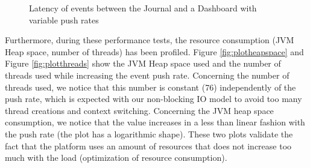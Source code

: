 \begin{figure}
  \begin{center} 
    \caption{Latency of events between the Journal and a Dashboard with variable push rates}
    \label{fig:severalrates}
  \end{center}
\end{figure}


Furthermore, during these performance tests, the resource consumption (JVM Heap space, number of threads) has been profiled. Figure \ref{fig:plotheapspace} and Figure \ref{fig:plotthreads} show the JVM Heap space used and the number of threads used while increasing the event push rate.
Concerning the number of threads used, we notice that this number is constant (76) independently of the push rate, which is expected with our non-blocking IO model to avoid too many thread creations and context switching.
Concerning the JVM heap space consumption, we notice that the value increases in a less than linear fashion with the push rate (the plot has a logarithmic shape).
These two plots validate the fact that the platform uses an amount of resources that does not increase too much with the load (optimization of resource consumption).

